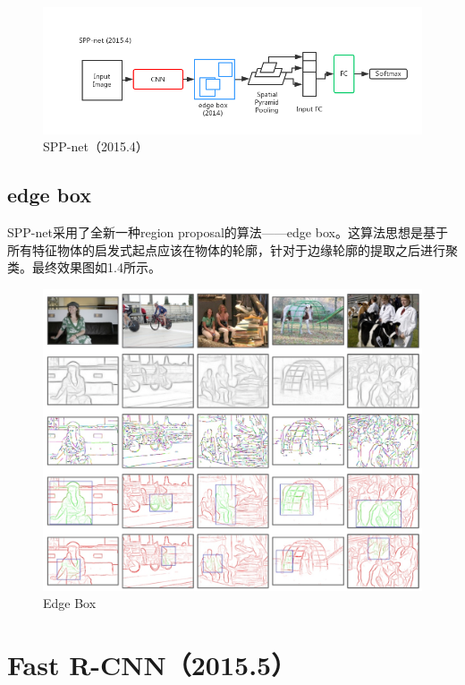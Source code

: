 \documentclass[a4paper,12pt]{report}
\begin{document}
\begin{spacing}{1.5}
\begin{figure}[!h]
	\begin{center}
		\includegraphics[width=0.92\linewidth]{figure//SPPnet.png}
		\caption{SPP-net（2015.4） }
		\label{Fig:3}
	\end{center}
\end{figure}

\subsection{edge box}
SPP-net采用了全新一种region proposal的算法——edge box。这算法思想是基于所有特征物体的启发式起点应该在物体的轮廓，针对于边缘轮廓的提取之后进行聚类。最终效果图如1.4所示。

\begin{figure}[!h]
	\begin{center}
		\includegraphics[width=0.7\linewidth]{figure//edgeBox.png}
		\caption{Edge Box }
		\label{Fig:4}
	\end{center}
\end{figure}

\section{Fast R-CNN（2015.5）}


\end{spacing}
\end{document}
